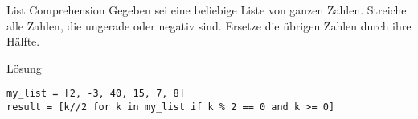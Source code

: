 \begin{fragile}[Übung]

\begin{block}{List Comprehension}
\vspace{2pt}
Gegeben sei eine beliebige Liste von ganzen Zahlen. Streiche alle Zahlen, die ungerade oder negativ sind. Ersetze die übrigen Zahlen durch ihre Hälfte. 
\end{block}


\vspace{12pt}

\begin{solutionblock}{Lösung}
\begin{verbatim}
my_list = [2, -3, 40, 15, 7, 8]
result = [k//2 for k in my_list if k % 2 == 0 and k >= 0]
\end{verbatim}
\end{solutionblock}

\end{fragile}


